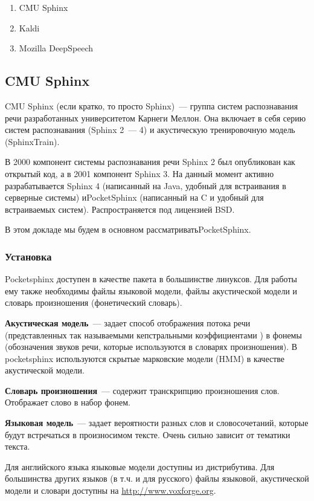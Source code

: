 \documentclass[10pt, a5paper]{article}
\begin{document}
\begin{enumerate}
  \item CMU Sphinx
  \item Kaldi
  \item Mozilla DeepSpeech
\end{enumerate}

\subsection*{CMU Sphinx}

CMU Sphinx (если кратко, то просто Sphinx)~--- группа систем распознавания речи разработанных университетом Карнеги Меллон. Она включает в себя серию систем распознавания (Sphinx 2~--- 4) и акустическую тренировочную модель (SphinxTrain).

В 2000 компонент системы распознавания речи Sphinx 2 был опубликован как открытый код, а в 2001 компонент Sphinx 3. На данный момент активно разрабатывается Sphinx 4 (написанный на Java, удобный для встраивания в серверные системы) и\linebreak PocketSphinx (написанный на C и удобный для встраиваемых систем). Распространяется под лицензией BSD.

В этом докладе мы будем в основном рассматривать\linebreak PocketSphinx.

\subsubsection*{Установка}

Pocketsphinx доступен в качестве пакета в большинстве линуксов. 
Для работы ему также необходимы файлы языковой модели, файлы акустической модели и словарь произношения (фонетический словарь).

\textbf{Акустическая модель}~--- задает способ отображения потока речи (представленных так называемыми кепстральными коэффициентами ) в фонемы (обозначения звуков речи, которые используются в словарях произношения). В pocketsphinx используются скрытые марковские модели (HMM) в качестве акустической модели.

\textbf{Словарь произношения}~--- содержит транскрипцию произношения слов. Отображает слово в набор фонем.

\textbf{Языковая модель}~--- задает вероятности разных слов и словосочетаний, которые будут встречаться в произносимом тексте. Очень сильно зависит от тематики текста.

Для английского языка языковые модели доступны из дистрибутива. Для большинства других языков (в т.ч.  и для русского) файлы языковой, акустической модели и словари доступны на \url{http://www.voxforge.org}.
\end{document}
